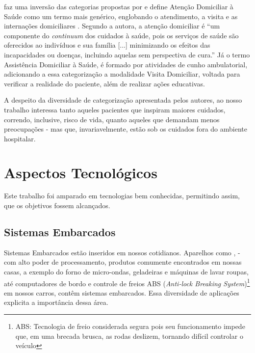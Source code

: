 
 faz uma inversão das categorias propostas
por  e  define Atenção Domiciliar à
Saúde como um termo mais genérico, englobando o atendimento, a visita e as
internações domiciliares \cite{giacomozzi2006pratica}. Segundo a autora, a
atenção domiciliar é ``um componente do \textit{continuum} dos cuidados à
saúde, pois os serviços de saúde são oferecidos ao indivíduos e sua família
[...] minimizando os efeitos das incapacidades ou doenças, incluindo aquelas
sem perspectiva de cura.'' Já o termo Assistência Domiciliar à Saúde, é formado
por atividades de cunho ambulatorial, adicionando a essa categorização a
modalidade Visita Domiciliar, voltada para verificar a realidade do paciente,
além de realizar ações educativas.

A despeito da diversidade de categorização apresentada pelos autores, ao nosso
trabalho interessa tanto aqueles pacientes que inspiram maiores cuidados,
correndo, inclusive, risco de vida, quanto aqueles que demandam menos
preocupações - mas que, invariavelmente, estão sob os cuidados fora do
ambiente hospitalar.

\section{Aspectos Tecnológicos}\label{sec:aspectos-tecnologicos}

Este trabalho foi amparado em tecnologias bem conhecidas, permitindo assim, 
que os objetivos fossem alcançados.

\subsection{Sistemas Embarcados}\label{subsec:sistemas-embarcados}

Sistemas Embarcados estão inseridos em nossos cotidianos. Aparelhos como
\smartphones[], \tablets[] - com alto poder de processamento,
produtos comumente encontrados em nossas casas, a exemplo do forno de 
micro-ondas, geladeiras e máquinas de lavar roupas, até computadores de bordo e
controle de freios ABS (\textit{Anti-lock Breaking System})\footnote{ABS:
Tecnologia  de freio considerada segura pois seu funcionamento impede que, em
uma brecada brusca, as rodas  deslizem, tornando difícil controlar o veículo} em
nossos carros, contêm sistemas embarcados. Essa diversidade de aplicações
explicita a importância dessa área.


